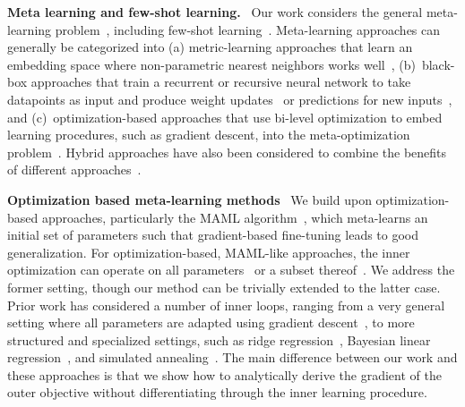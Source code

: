 \documentclass{article} \usepackage[nonatbib, final]{mod_neurips}
\begin{document}
\textbf{Meta learning and few-shot learning.} \ 
Our work considers the general meta-learning problem~\cite{schmidhuber1987, thrun, naik}, including few-shot learning~\cite{omniglot,matchingnets}. Meta-learning approaches can generally be categorized into (a) metric-learning approaches that learn an embedding space where non-parametric nearest neighbors works well~\cite{siameseoneshot,matchingnets,snell2017prototypical,oreshkin2018tadam,allen2019infinite}, (b)~black-box approaches that train a recurrent or recursive neural network to take datapoints as input and produce weight updates~\cite{hochreiter,andrychowicz2016learning,li2016learning,ravi2016optimization} or predictions for new inputs~\cite{mann,rl2,learningrl,munkhdalai2017meta,mishra2017simple}, and (c)~optimization-based approaches that use bi-level optimization to embed learning procedures, such as gradient descent, into the meta-optimization problem~\cite{maml,finn2018learning,bertinetto2018meta,zintgraf2018caml}. Hybrid approaches have also been considered to combine the benefits of different approaches~\cite{rusu2018meta,triantafillou2019meta}.


\textbf{Optimization based meta-learning methods} \
We build upon optimization-based approaches, particularly the MAML algorithm~\cite{maml}, which meta-learns an initial set of parameters such that gradient-based fine-tuning leads to good generalization. 
For optimization-based, MAML-like approaches, the inner optimization can operate on all parameters~\cite{maml,metasgd,finn2018probabilistic} or a subset thereof~\cite{zintgraf2018caml,zhou2018deep,harrison2018meta}.
We address the former setting, though our method can be trivially extended to the latter case.
Prior work has considered a number of inner loops, ranging from a very general setting where all parameters are adapted using gradient descent~\cite{maml}, to more structured and specialized settings, such as ridge regression~\cite{bertinetto2018meta}, Bayesian linear regression~\cite{harrison2018meta}, and simulated annealing~\cite{alet2018modular}.
The main difference between our work and these approaches is that we show how to analytically derive the gradient of the outer objective without differentiating through the inner learning procedure. 
\end{document}
